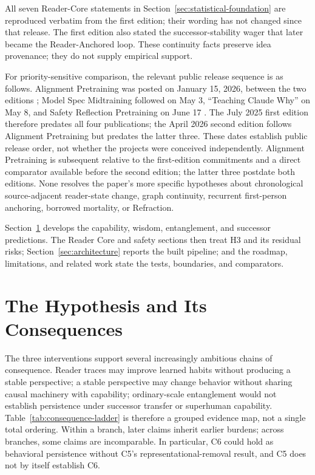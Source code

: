 \documentclass[11pt]{article}
\begin{document}
All seven Reader-Core statements in Section~\ref{sec:statistical-foundation}
are reproduced verbatim from the first edition; their wording has not changed
since that release. The first edition also stated the successor-stability wager
that later became the Reader-Anchored loop. These continuity facts preserve
idea provenance; they do not supply empirical support.

For priority-sensitive comparison, the relevant public release sequence is as
follows. Alignment Pretraining was posted on January 15, 2026, between the two editions
\cite{betley2025alignment}; Model Spec Midtraining followed on May 3,
``Teaching Claude Why'' on May 8, and Safety Reflection Pretraining on June 17
\cite{li2026modelspec,kutasov2026teachingclaudewhy,li2026safetyreflection}.
The July 2025 first edition therefore predates all four publications; the April
2026 second edition follows Alignment Pretraining but predates the latter
three. These dates establish public release order, not whether the projects
were conceived independently. Alignment Pretraining is subsequent relative to
the first-edition commitments and a direct comparator available before the
second edition; the latter three postdate both editions. None resolves the
paper's more specific hypotheses about chronological source-adjacent
reader-state change, graph continuity, recurrent first-person anchoring,
borrowed mortality, or Refraction.

Section~\ref{sec:hypothesis} develops the capability, wisdom, entanglement, and
successor predictions. The Reader Core and safety sections then treat H3 and its
residual risks; Section~\ref{sec:architecture} reports the built pipeline; and
the roadmap, limitations, and related work state the tests, boundaries, and
comparators.

\section{The Hypothesis and Its Consequences}\label{sec:hypothesis}

The three interventions support several increasingly ambitious chains of
consequence. Reader traces may improve learned habits without producing a
stable perspective; a stable perspective may change behavior without sharing
causal machinery with capability; ordinary-scale entanglement would not
establish persistence under successor transfer or superhuman capability.
Table~\ref{tab:consequence-ladder} is therefore a grouped evidence map, not a
single total ordering. Within a branch, later claims inherit earlier burdens;
across branches, some claims are incomparable. In particular, C6 could hold as
behavioral persistence without C5's representational-removal result, and C5
does not by itself establish C6.
\end{document}
